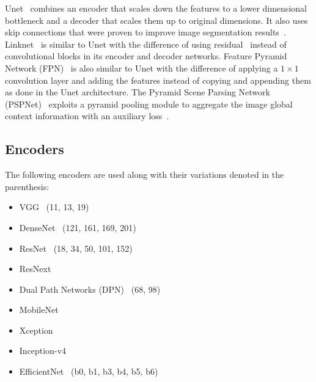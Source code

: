 \documentclass{elsarticle}
\begin{document}
Unet~\cite{ronneberger2015u} combines an encoder that scales down the features to a lower dimensional bottleneck and a decoder that scales them up to original dimensions.
It also uses skip connections that were proven to improve image segmentation results~\cite{drozdzal2016importance}.
Linknet~\cite{chaurasia2017linknet} is similar to Unet with the difference of using residual~\cite{he2016deep} instead of convolutional blocks in its encoder and decoder networks.
Feature Pyramid Network (FPN)~\cite{lin2017feature} is also similar to Unet with the difference of applying a $1\times1$ convolution layer and adding the features instead of copying and appending them as done in the Unet architecture.
The Pyramid Scene Parsing Network (PSPNet)~\cite{zhao2017pyramid} exploits a pyramid pooling module to aggregate the image global context information with an auxiliary loss~\cite{hu2019comparison}.

\subsection{Encoders}\label{sec:encoders}
The following encoders are used along with their variations denoted in the parenthesis:
\begin{itemize}
  \item VGG~\cite{simonyan2014very} (11, 13, 19)
  \item DenseNet~\cite{huang2017densely} (121, 161, 169, 201)
  \item ResNet~\cite{he2016deep} (18, 34, 50, 101, 152)
  \item ResNext~\cite{xie2017aggregated}
  \item Dual Path Networks (DPN)~\cite{chen2017dual} (68, 98)
  \item MobileNet~\cite{howard2017mobilenets}
  \item Xception~\cite{chollet2017xception}
  \item Inception-v4~\cite{szegedy2017inception}
  \item EfficientNet~\cite{tan2019efficientnet} (b0, b1, b3, b4, b5, b6)
\end{itemize}
\end{document}
